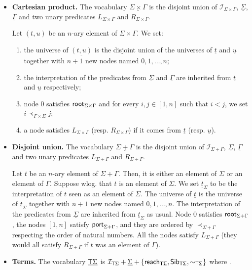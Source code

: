      \begin{itemize}
\item {\bf Cartesian product.} The vocabulary $\underline{\Sigma\times\Gamma}$ is the disjoint union of $\mathcal{I}_{\Sigma\times\Gamma}$, $\underline{\Sigma}$, $\underline{\Gamma}$ and two unary predicates $L_{\Sigma\times\Gamma}$ and $R_{\Sigma\times\Gamma}$.

 Let $(t,u)$ be an $n$-ary element of $\Sigma \times \Gamma$. We set:
        \begin{enumerate}
       \item the universe of $\underline{(t,u)}$ is the disjoint union of the universes of $\underline{t}$ and $\underline{u}$ together with $n+1$ new nodes named $0,1,\dots, n$;
       \item the interpretation of the predicates from $\underline \Sigma$ and $\underline \Gamma$ are inherited from $\underline{t}$ and $\underline {u}$ respectively;
       \item node $0$ satisfies $\mathsf{root}_{\Sigma\times\Gamma}$ and for every $i,j \in[1,n]$ such that $i<j$, we set $i \prec_{\Gamma\times\Sigma} j$;
        \item a node satisfies $L_{\Sigma\times\Gamma}$ (resp. $R_{\Sigma\times\Gamma}$) if it comes from $\underline{t}$ (resp.  $\underline{u}$).  
        \end{enumerate}
 \item {\bf Disjoint union.} The vocabulary $\underline{\Sigma+\Gamma}$ is the disjoint union of $\mathcal{I}_{\Sigma+\Gamma}$, $\underline{\Sigma}$, $\underline{\Gamma}$ and two unary predicates $L_{\Sigma+\Gamma}$ and $R_{\Sigma+\Gamma}$.

Let $t$ be an $n$-ary element of $\Sigma+\Gamma$. Then, it is either an element of $\Sigma$ or an element of $\Gamma$. Suppose wlog. that $t$ is an element of $\Sigma$. We set $\underline{t}_\Sigma$ to be the interpretation of $t$ seen as an element of $\Sigma$. The universe of $\underline{t}$ is the universe of $\underline{t}_\Sigma$ together with $n+1$ new nodes named $0,1,\dots,n$. The interpretation of the predicates from $\underline \Sigma$ are inherited from $\underline{t}_\Sigma$ as usual. Node $0$ satisfies $\mathsf{root}_{\Sigma+\Gamma}$, the nodes $[1,n]$ satisfy $\mathsf{port}_{\Sigma+\Gamma}$, and they are ordered by $\prec_{\Sigma+\Gamma}$ respecting the order of natural numbers. All the nodes satisfy $L_{\Sigma+\Gamma}$ (they would all satisfy $R_{\Sigma+\Gamma}$ if $t$ was an element of $\Gamma$).
        
        \item {\bf Terms.} The vocabulary $\underline {\mathsf T \Sigma}$ is $\mathcal{I}_{\mathsf T\Sigma}+\underline{\Sigma}+\{\sf{reach}_{\mathsf T \Sigma}, \sf{Sib}_{\mathsf T \Sigma}, \sim_{\mathsf T \Sigma}\}$ where . 
    

\end{itemize}
